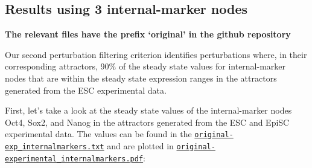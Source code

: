 \documentclass[
]{book}
\begin{document}
\hypertarget{results-using-3-internal-marker-nodes}{%
\subsection{Results using 3 internal-marker nodes}\label{results-using-3-internal-marker-nodes}}

\textbf{The relevant files have the prefix `original' in the github repository}

Our second perturbation filtering criterion identifies perturbations where, in their corresponding attractors, 90\% of the steady state values for internal-marker nodes that are within the steady state expression ranges in the attractors generated from the ESC experimental data.

First, let's take a look at the steady state values of the internal-marker nodes Oct4, Sox2, and Nanog in the attractors generated from the ESC and EpiSC experimental data. The values can be found in the \href{https://github.com/VeraLiconaResearchGroup/Netisce/blob/main/ipsc_validation/results/original-exp_internalmarkers.txt}{\texttt{original-exp\_internalmarkers.txt}} and are plotted in \href{https://github.com/VeraLiconaResearchGroup/Netisce/blob/main/ipsc_validation/results/original-experimental_internalmarkers.pdf}{\texttt{original-experimental\_internalmarkers.pdf}}:
\end{document}
